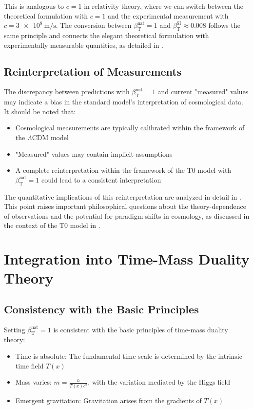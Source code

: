 \documentclass[12pt,a4paper]{article}
\newcommand{\Tfield}{T(x)}
\newcommand{\betaT}{\beta_{\text{T}}}
\begin{document}
	This is analogous to \(c = 1\) in relativity theory, where we can switch between the theoretical formulation with \(c = 1\) and the experimental measurement with \(c = \SI{3e8}{\meter\per\second}\). The conversion between \(\betaT^{\text{nat}} = 1\) and \(\betaT^{\text{SI}} \approx 0.008\) follows the same principle and connects the elegant theoretical formulation with experimentally measurable quantities, as detailed in \cite{pascher_alphabeta_2025}.
	
	\subsection{Reinterpretation of Measurements}
	\label{subsec:reassessment}
	
	The discrepancy between predictions with \(\betaT^{\text{nat}} = 1\) and current "measured" values may indicate a bias in the standard model's interpretation of cosmological data. It should be noted that:
	\begin{itemize}
		\item Cosmological measurements are typically calibrated within the framework of the \(\Lambda\)CDM model
		\item "Measured" values may contain implicit assumptions
		\item A complete reinterpretation within the framework of the T0 model with \(\betaT^{\text{nat}} = 1\) could lead to a consistent interpretation
	\end{itemize}
	
	The quantitative implications of this reinterpretation are analyzed in detail in \cite{pascher_alphabeta_2025}. This point raises important philosophical questions about the theory-dependence of observations and the potential for paradigm shifts in cosmology, as discussed in the context of the T0 model in \cite{pascher_messdifferenzen_2025}.
	
	\section{Integration into Time-Mass Duality Theory}
	\label{sec:integration}
	
	\subsection{Consistency with the Basic Principles}
	\label{subsec:consistency_principles}
	
	Setting \(\betaT^{\text{nat}} = 1\) is consistent with the basic principles of time-mass duality theory:
	\begin{itemize}
		\item Time is absolute: The fundamental time scale is determined by the intrinsic time field \(\Tfield\)
		\item Mass varies: \(m = \frac{\hbar}{\Tfield c^2}\), with the variation mediated by the Higgs field
		\item Emergent gravitation: Gravitation arises from the gradients of \(\Tfield\)
	\end{itemize}
	
\end{document}
